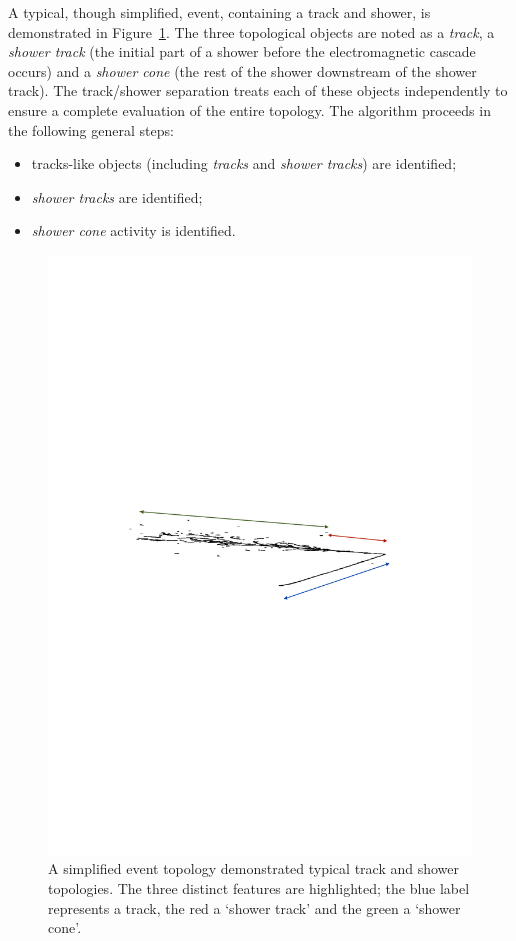 A typical, though simplified, event, containing a track and shower, is demonstrated in Figure~\ref{fig:TrackShowerTopology}.  The three topological objects are noted as a \textit{track}, a \textit{shower track} (the initial part of a shower before the electromagnetic cascade occurs) and a \textit{shower cone} (the rest of the shower downstream of the shower track).  The track/shower separation treats each of these objects independently to ensure a complete evaluation of the entire topology.  The algorithm proceeds in the following general steps:
\begin{itemize}
  \item tracks-like objects (including \textit{tracks} and \textit{shower tracks}) are identified;
  \item \textit{shower tracks} are identified;
  \item \textit{shower cone} activity is identified.
\end{itemize}

\begin{figure}
  \centering
  \includegraphics[width=12cm]{TrackShowerExampleEVDAnnotated.pdf}
  \caption[A simplified event topology demonstrated typical track and shower topologies.]{A simplified event topology demonstrated typical track and shower topologies.  The three distinct features are highlighted; the blue label represents a track, the red a `shower track' and the green a `shower cone'.}
  \label{fig:TrackShowerTopology}
\end{figure}

